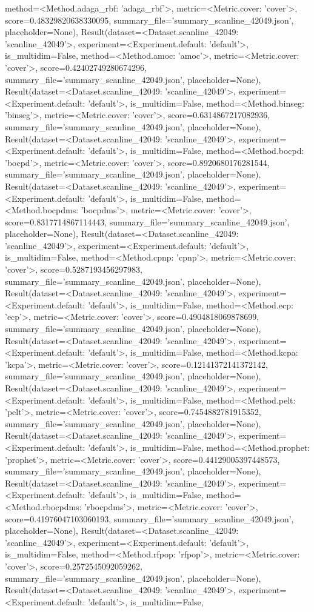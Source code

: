 method=<Method.adaga_rbf: 'adaga_rbf'>, metric=<Metric.cover: 'cover'>, score=0.48329820638330095, summary_file='summary_scanline_42049.json', placeholder=None), Result(dataset=<Dataset.scanline_42049: 'scanline_42049'>, experiment=<Experiment.default: 'default'>, is_multidim=False, method=<Method.amoc: 'amoc'>, metric=<Metric.cover: 'cover'>, score=0.42402749280674296, summary_file='summary_scanline_42049.json', placeholder=None), Result(dataset=<Dataset.scanline_42049: 'scanline_42049'>, experiment=<Experiment.default: 'default'>, is_multidim=False, method=<Method.binseg: 'binseg'>, metric=<Metric.cover: 'cover'>, score=0.6314867217082936, summary_file='summary_scanline_42049.json', placeholder=None), Result(dataset=<Dataset.scanline_42049: 'scanline_42049'>, experiment=<Experiment.default: 'default'>, is_multidim=False, method=<Method.bocpd: 'bocpd'>, metric=<Metric.cover: 'cover'>, score=0.8920680176281544, summary_file='summary_scanline_42049.json', placeholder=None), Result(dataset=<Dataset.scanline_42049: 'scanline_42049'>, experiment=<Experiment.default: 'default'>, is_multidim=False, method=<Method.bocpdms: 'bocpdms'>, metric=<Metric.cover: 'cover'>, score=0.8317714867114443, summary_file='summary_scanline_42049.json', placeholder=None), Result(dataset=<Dataset.scanline_42049: 'scanline_42049'>, experiment=<Experiment.default: 'default'>, is_multidim=False, method=<Method.cpnp: 'cpnp'>, metric=<Metric.cover: 'cover'>, score=0.5287193456297983, summary_file='summary_scanline_42049.json', placeholder=None), Result(dataset=<Dataset.scanline_42049: 'scanline_42049'>, experiment=<Experiment.default: 'default'>, is_multidim=False, method=<Method.ecp: 'ecp'>, metric=<Metric.cover: 'cover'>, score=0.4904818069878699, summary_file='summary_scanline_42049.json', placeholder=None), Result(dataset=<Dataset.scanline_42049: 'scanline_42049'>, experiment=<Experiment.default: 'default'>, is_multidim=False, method=<Method.kcpa: 'kcpa'>, metric=<Metric.cover: 'cover'>, score=0.12141372141372142, summary_file='summary_scanline_42049.json', placeholder=None), Result(dataset=<Dataset.scanline_42049: 'scanline_42049'>, experiment=<Experiment.default: 'default'>, is_multidim=False, method=<Method.pelt: 'pelt'>, metric=<Metric.cover: 'cover'>, score=0.7454882781915352, summary_file='summary_scanline_42049.json', placeholder=None), Result(dataset=<Dataset.scanline_42049: 'scanline_42049'>, experiment=<Experiment.default: 'default'>, is_multidim=False, method=<Method.prophet: 'prophet'>, metric=<Metric.cover: 'cover'>, score=0.44129005397448573, summary_file='summary_scanline_42049.json', placeholder=None), Result(dataset=<Dataset.scanline_42049: 'scanline_42049'>, experiment=<Experiment.default: 'default'>, is_multidim=False, method=<Method.rbocpdms: 'rbocpdms'>, metric=<Metric.cover: 'cover'>, score=0.41976047103060193, summary_file='summary_scanline_42049.json', placeholder=None), Result(dataset=<Dataset.scanline_42049: 'scanline_42049'>, experiment=<Experiment.default: 'default'>, is_multidim=False, method=<Method.rfpop: 'rfpop'>, metric=<Metric.cover: 'cover'>, score=0.2572545092059262, summary_file='summary_scanline_42049.json', placeholder=None), Result(dataset=<Dataset.scanline_42049: 'scanline_42049'>, experiment=<Experiment.default: 'default'>, is_multidim=False, 